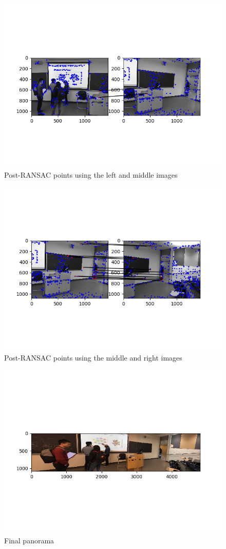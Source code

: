\documentclass[10pt]{article}
\begin{document}
	\begin{figure}[h]
		\caption{Post-RANSAC points using the left and middle images}
		\centering
		\includegraphics{img/postranLM.png}
	\end{figure}
	
	\begin{figure}[h]
		\caption{Post-RANSAC points using the middle and right images}
		\centering
		\includegraphics{img/postranMR.png}
	\end{figure}
	

	\begin{figure}[h]
		\caption{Final panorama}
		\centering
		\includegraphics{img/mosaic.png}
	\end{figure}
\end{document}
